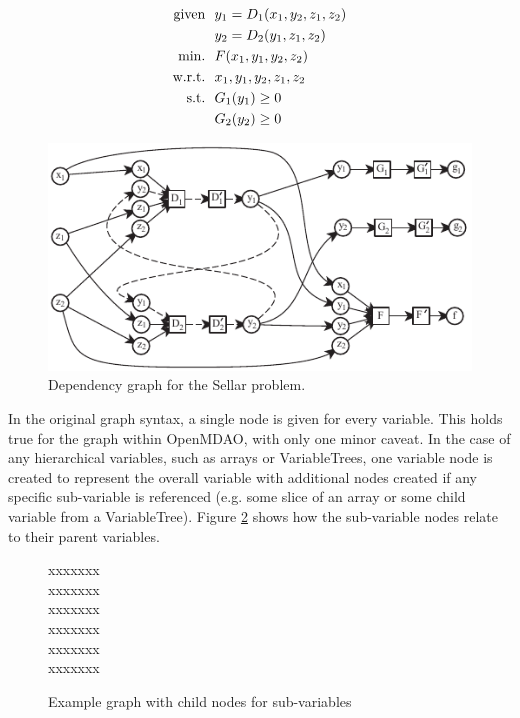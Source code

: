 \documentclass[]{aiaa-tc} %
\newcommand{\txt}{\textrm}
\begin{document}
    \begin{align}
        \txt{given} & \ \ y_1 = D_1(x_1,y_2,z_1,z_2) \notag
        \\      & \ \ y_2 = D_2(y_1,z_1,z_2) \notag
        \\\txt{min.} &\ \ F(x_1,y_1,y_2,z_2) \notag
        \\\txt{w.r.t.} & \ \ x_1,y_1,y_2,z_1,z_2 \notag
        \\\txt{s.t.} & \ \ G_1(y_1) \geq 0 \notag
        \\     & \ \ G_2(y_2) \geq 0
        \label{eqn:sellar_formulation}
    \end{align}


    \begin{figure}[!htb]\begin{center}
      \includegraphics[width=.8\textwidth]{images/sellar_cycles}
      \caption{ Dependency graph for the Sellar problem. \label{fig:sellar_graph}}
    \end{center}\end{figure}

    In the original graph syntax, a single node is given for every variable. This holds true for the graph
    within OpenMDAO, with only one minor caveat. In the case of any hierarchical variables, such as arrays
    or VariableTrees, one variable node is created to represent the overall variable with additional nodes
    created if any specific sub-variable is referenced (e.g. some slice of an array or some child variable from a
    VariableTree). Figure \ref{fig:subvars} shows how the sub-variable nodes relate to their parent variables.

     \begin{figure}[!htb]\begin{center}
      xxxxxxx\\xxxxxxx\\xxxxxxx\\xxxxxxx\\xxxxxxx\\xxxxxxx\\
      \caption{ Example graph with child nodes for sub-variables \label{fig:subvars}}
    \end{center}\end{figure}
\end{document}
